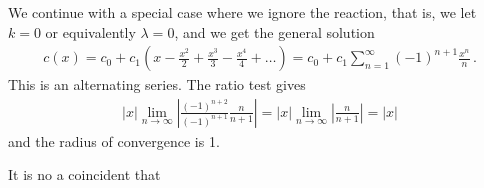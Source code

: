 \begin{example}
	We continue with a special case where we ignore the reaction, that is, we let $k=0$ or equivalently $\lambda = 0$, 
	and we get the general solution
	\begin{eqnarray}
		c(x) = c_0+ c_1 
		\left(
			x - \frac{x^2}{2} + \frac{x^3}{3} - \frac{x^4}{4} + \ldots\right)
		 = c_0 + c_1 \sum_{n=1}^\infty (-1)^{n+1}\frac{x^n}{n} \, .
			\end{eqnarray}
	This is an alternating series. The ratio test gives
	\begin{eqnarray}
		|x| \lim_{n \rightarrow \infty} \left| \frac{(-1)^{n+2}}{(-1)^{n+1}} \frac{n}{n+1}	\right|
		= 	|x| \lim_{n \rightarrow \infty} \left| \frac{n}{n+1}\right| = |x|
	\end{eqnarray}
	and the radius of convergence is 1. 
\end{example}

\bigskip

\noindent It is no a coincident that  

\fi
